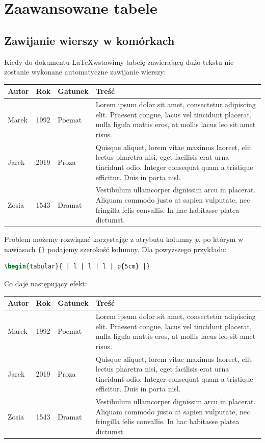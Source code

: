 \documentclass[10pt,a4paper]{article}
\begin{document}
\section{Zaawansowane tabele}

\subsection{Zawijanie wierszy w komórkach}

Kiedy do dokumentu \LaTeX wstawimy tabelę zawierającą dużo tekstu nie zostanie wykonane automatyczne zawijanie wierszy:

\begin{tabular}{| l | l | l | l |}
	\hline
	Autor & Rok & Gatunek & Treść \\ \hline
	Marek & 1992 & Poemat & Lorem ipsum dolor sit amet, consectetur adipiscing elit. Praesent congue, lacus vel tincidunt placerat, nulla ligula mattis eros, at mollis lacus leo sit amet risus. \\ \hline
	Jarek & 2019 & Proza & Quisque aliquet, lorem vitae maximus laoreet, elit lectus pharetra nisi, eget facilisis erat urna tincidunt odio. Integer consequat quam a tristique efficitur. Duis in porta nisl. \\ \hline
	Zosia & 1543 & Dramat & Vestibulum ullamcorper dignissim arcu in placerat. Aliquam commodo justo at sapien vulputate, nec fringilla felis convallis. In hac habitasse platea dictumst. \\
	\hline
\end{tabular}

Problem możemy rozwiązać korzystając z atrybutu kolumny \emph{p}, po którym w nawiasach \lstinline|{}| podajemy szerokość kolumny. Dla powyższego przykładu:

\begin{lstlisting}[language=TeX]
\begin{tabular}{ | l | l | l | p{5cm} |}
\end{lstlisting}

Co daje następujący efekt:

\begin{tabular}{ | l | l | l | p{5cm} |}
	\hline
	Autor & Rok & Gatunek & Treść \\ \hline
	Marek & 1992 & Poemat & Lorem ipsum dolor sit amet, consectetur adipiscing elit. Praesent congue, lacus vel tincidunt placerat, nulla ligula mattis eros, at mollis lacus leo sit amet risus. \\ \hline
	Jarek & 2019 & Proza & Quisque aliquet, lorem vitae maximus laoreet, elit lectus pharetra nisi, eget facilisis erat urna tincidunt odio. Integer consequat quam a tristique efficitur. Duis in porta nisl. \\ \hline
	Zosia & 1543 & Dramat & Vestibulum ullamcorper dignissim arcu in placerat. Aliquam commodo justo at sapien vulputate, nec fringilla felis convallis. In hac habitasse platea dictumst. \\
	\hline
\end{tabular}
\end{document}
